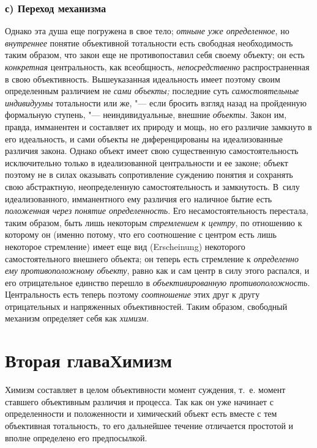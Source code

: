 \subsection[с) Переход механизма]{с) Переход механизма}

Однако эта душа еще погружена в свое тело;
{\em отныне уже определенное},
но {\em внутреннее}
понятие объективной тотальности есть свободная необходимость
таким образом, что закон еще не противопоставил себя своему объекту; он
есть {\em конкретная}
центральность, как всеобщность,
{\em непосредственно}
распространенная в свою объективность. Вышеуказанная
идеальность имеет поэтому своим определенным различием не
{\em сами объекты;}
последние суть
{\em самостоятельные индивидуумы}
тотальности или же, "--- если бросить взгляд
назад на пройденную формальную ступень, "--- неиндивидуальные,
внешние {\em объекты}.
Закон им, правда, имманентен и составляет их природу и мощь,
но его различие замкнуто в его идеальность, и сами объекты не
диференцированы на идеализованные различия закона. Однако объект имеет свою
существенную самостоятельность исключительно только в идеализованной
центральности и ее законе; объект поэтому не в силах оказывать
сопротивление суждению понятия и сохранять свою абстрактную, неопределенную
самостоятельность и замкнутость. В~силу идеализованного, имманентного ему
различия его наличное бытие есть
{\em положенная}
{\em через понятие определенность}.
Его несамостоятельность перестала, таким образом, быть лишь
некоторым {\em стремлением к центру},
по отношению к которому он (именно потому, что его
соотношение с центром есть лишь некоторое стремление) имеет еще вид
(Erscheinung) некоторого самостоятельного внешнего объекта;
он теперь есть стремление к
{\em определенно ему противоположному
объекту}, равно как и сам центр в силу этого распался, и его
отрицательное единство перешло в
{\em объективированную
противоположность}. Центральность есть теперь
поэтому
{\em соотношение} этих
друг к другу отрицательных и напряженных объективностей. Таким образом,
свободный механизм определяет себя как
{\em химизм}.

\chapter[Вторая глава Химизм]{Вторая глава\newline Химизм}

Химизм составляет в целом объективности момент суждения, т.~е.
момент ставшего объективным различия и процесса. Так как он уже начинает с
определенности и положенности и химический объект есть вместе с тем
объективная тотальность, то его дальнейшее течение отличается простотой и
вполне определено его предпосылкой.

